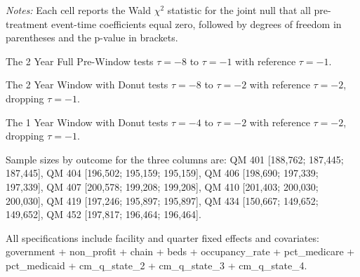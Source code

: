 \documentclass[11pt]{article}
\begin{document}
\begin{table}[!ht]
\begin{threeparttable}
\begin{tablenotes}[flushleft]
\footnotesize
\item \textit{Notes:} Each cell reports the Wald $\chi^2$ statistic for the joint null that all pre-treatment event-time coefficients equal zero, followed by degrees of freedom in parentheses and the p-value in brackets.
\item The 2 Year Full Pre-Window tests $\tau=-8$ to $\tau=-1$ with reference $\tau=-1$.
\item The 2 Year Window with Donut tests $\tau=-8$ to $\tau=-2$ with reference $\tau=-2$, dropping $\tau=-1$.
\item The 1 Year Window with Donut tests $\tau=-4$ to $\tau=-2$ with reference $\tau=-2$, dropping $\tau=-1$.
\item Sample sizes by outcome for the three columns are:
QM 401 [188,762; 187,445; 187,445],
QM 404 [196,502; 195,159; 195,159],
QM 406 [198,690; 197,339; 197,339],
QM 407 [200,578; 199,208; 199,208],
QM 410 [201,403; 200,030; 200,030],
QM 419 [197,246; 195,897; 195,897],
QM 434 [150,667; 149,652; 149,652],
QM 452 [197,817; 196,464; 196,464].
\item All specifications include facility and quarter fixed effects and covariates: government + non\_profit + chain + beds + occupancy\_rate + pct\_medicare + pct\_medicaid + cm\_q\_state\_2 + cm\_q\_state\_3 + cm\_q\_state\_4.
\end{tablenotes}
\end{threeparttable}
\end{table}
\endgroup
\end{document}

